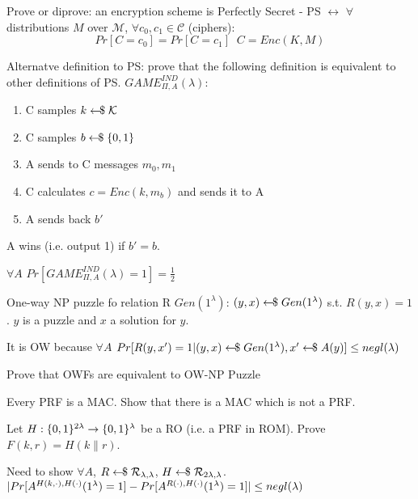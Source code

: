 \documentclass{exam}
\begin{document}
\begin{questions}
    \question
        Prove or diprove: an encryption scheme is Perfectly Secret - PS $\leftrightarrow$ $\forall$distributions $M$ over $\mathcal{M}$, $\forall c_0, c_1 \in \mathcal{C}$ (ciphers):
        \[ Pr[C=c_0] = Pr[C = c_1] \;\; C=Enc(K,M)\]
    
    \question
        Alternatve definition to PS: prove that the following definition is equivalent to other definitions of PS.\newline
        $GAME_{\Pi,A}^{IND}(\lambda)$:
        \begin{enumerate}
            \item C samples $k \leftarrow\kern-0.42em{\$} \; \mathcal{K}$
            \item C samples $b \leftarrow\kern-0.42em{\$} \; \{0,1\}$
            \item A sends to C messages $m_0,m_1$
            \item C calculates $c = Enc(k,m_b)$ and sends it to A
            \item A sends back $b'$
        \end{enumerate}
        A wins (i.e. output 1) if $b' = b$.

        $\forall A$ $Pr[GAME_{\Pi,A}^{IND}(\lambda) = 1] = \frac{1}{2}$
    
    \question
        One-way NP puzzle fo relation R\newline
        $Gen(1^\lambda)$: $(y,x) \leftarrow\kern-0.42em{\$} \; Gen(1^\lambda)$ s.t. $R(y,x) = 1$.\newline
        $y$ is a puzzle and $x$ a solution for $y$.

        It is OW because $\forall A$ $Pr[R(y,x')=1 \vert (y,x) \leftarrow\kern-0.42em{\$} \; Gen(1^\lambda), x' \leftarrow\kern-0.42em{\$} \; A(y)] \leq negl(\lambda)$

        Prove that OWFs are equivalent to OW-NP Puzzle
    
    \question
        Every PRF is a MAC. Show that there is a MAC which is not a PRF.

    \question
        Let $H : \{0,1\}^{2\lambda} \rightarrow \{0,1\}^\lambda$ be a RO (i.e. a PRF in ROM). Prove $F(k,r) = H(k \|  r)$.

        Need to show $\forall A$, $R \leftarrow\kern-0.42em{\$} \; \mathcal{R_{\lambda,\lambda}}$, $H \leftarrow\kern-0.42em{\$} \; \mathcal{R}_{2\lambda,\lambda}$.\newline
        $\vert  Pr[A^{H(k,\cdot),H(\cdot)} (1^\lambda) = 1] - Pr[A^{R(\cdot),H(\cdot)} (1^\lambda) = 1] \vert \leq negl(\lambda)$


\end{questions}
\end{document}
